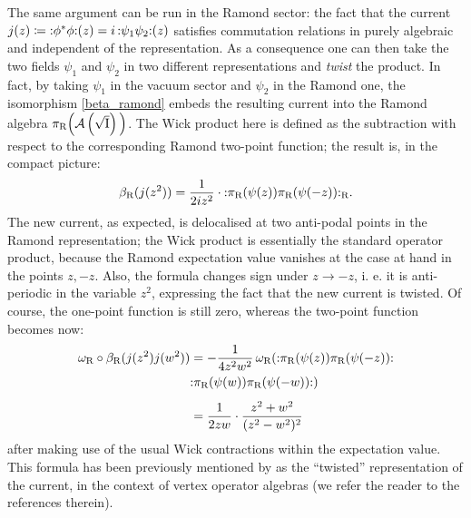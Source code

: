 \bigskip 
The same argument can be run in the Ramond sector:
the fact that the current $j(z)\coloneqq 
\wick{\phi^*\phi}(z)=i\,\wick{\psi_1\psi_2}(z)$
satisfies commutation relations in purely algebraic
and independent of the representation. As a consequence 
one can then take the two fields $\psi_1$ and $\psi_2$ in two
different representations and \emph{twist} the 
product. In fact, by taking $\psi_1$ in the vacuum
sector and $\psi_2$ in the Ramond one, the 
isomorphism \eqref{beta_ramond} embeds the 
resulting current into the Ramond algebra 
$\pi_{\textrm{R}}\Big(\mathcal{A}\left(\sqrt{\textrm{I}}\right)\Big)$. The Wick 
product here is defined as the subtraction with 
respect to the corresponding Ramond two-point function; 
the result is, in the compact picture:
\[
\beta_{\textrm{R}}(j(z^2))=\frac{1}{2i z^2} \cdot 
\wick{\ram{z}\ram{-z}}_{\textrm{R}}.
\]
The new current, as expected, is delocalised at two 
anti-podal points in the Ramond representation; the 
Wick product is essentially the standard operator 
product, because the Ramond expectation value vanishes
at the case at hand in the points $z,-z$. Also, the 
formula changes sign under $z\to -z$, i. e. it is
anti-periodic in the variable $z^2$, expressing the fact
that the new current is twisted. Of course, the one-point 
function is still zero, whereas the two-point function 
becomes now:
\begin{align*}
\omega_{\textrm{R}}\circ\beta_{\textrm{R}}
(j(z^2)j(w^2))&= -\frac{1}{4z^2w^2}\,\omega_{\textrm{R}}
(\wick{\ram{z}\ram{-z}}\\
&\wick{\ram{w}\ram{-w}})\\[1ex]
&=\frac{1}{2zw}\cdot\frac{z^2+w^2}{(z^2-w^2)^2}
\end{align*}
after making use of the usual Wick contractions within the 
expectation value. This formula has been previously
mentioned by \cite{Ang:2011} as the ``twisted'' 
representation of the current, in the context of
vertex operator algebras (we refer the reader to 
the references therein).










